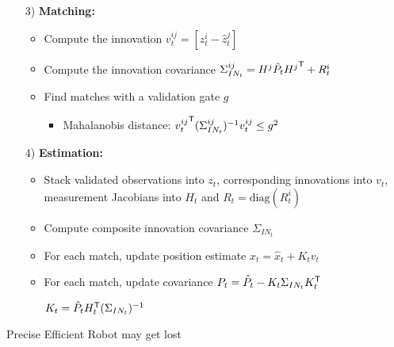\begin{itemize}
\begin{itemize}
\begin{itemize}
                    \item[3)] \textbf{Matching:}
                        \begin{itemize}
                            \item Compute the innovation $v_t^{ij} = [z_t^i - \hat z_t^j]$
                            \item Compute the innovation covariance $\Sigma_{IN_t}^{ij} = H^j \hat P_t {H^j}^{\mathsf{T}} + R_t^i$
                            \item Find matches with a validation gate $g$
                                \begin{itemize}
                                    \item Mahalanobis distance: ${v_t^{ij}}^{\mathsf{T}} (\Sigma_{IN_t}^{ij})^{-1} v_t^{ij} \le g^2$
                                \end{itemize}
                        \end{itemize}
                    \item[4)] \textbf{Estimation:}
                        \begin{itemize}
                            \item Stack validated observations into $z_t$, corresponding innovations into $v_t$, measurement Jacobians into $H_t$ and $R_t = \mathrm{diag}(R_t^i)$
                            \item Compute composite innovation covariance $\Sigma_{IN_t}$
                            \item For each match, update position estimate $x_t = \hat x_t + K_t v_t$
                            \item For each match, update covariance $P_t = \hat P_t - K_t \Sigma_{IN_t}K_t^{\mathsf{T}}$
                                \begin{itemize}
                                     $K_t = \hat P_t H_t^{\mathsf{T}} (\Sigma_{IN_t})^{-1}$
                                \end{itemize}
                        \end{itemize}
                \end{itemize}
        \end{itemize}
    \ipro Precise
    \ipro Efficient
    \icon Robot may get lost
\end{itemize}
